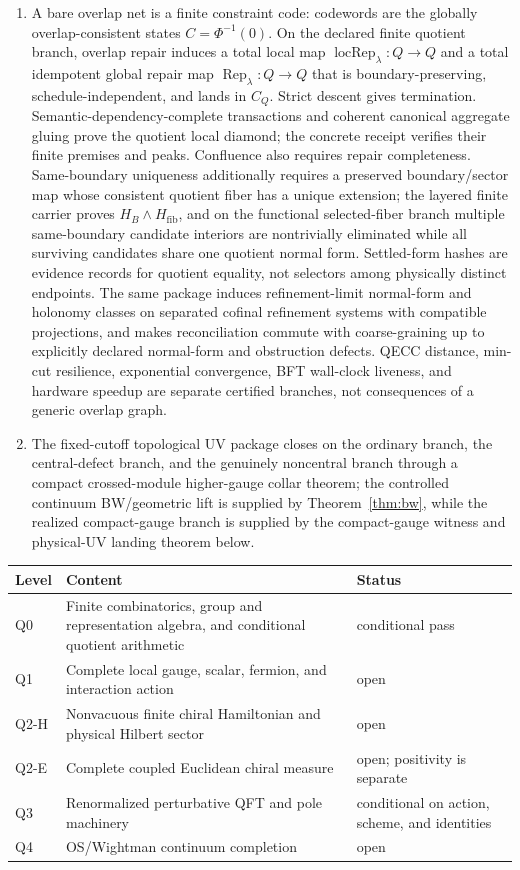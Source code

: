 \documentclass[11pt]{article}
\begin{document}
\begin{enumerate}[leftmargin=2em]
\item A bare overlap net is a finite constraint code: codewords are the globally overlap-consistent states \(C=\Phi^{-1}(0)\). On the declared finite quotient branch, overlap repair induces a total local map \(\operatorname{locRep}_\lambda:Q\to Q\) and a total idempotent global repair map \(\operatorname{Rep}_\lambda:Q\to Q\) that is boundary-preserving, schedule-independent, and lands in \(C_Q\). Strict descent gives termination. Semantic-dependency-complete transactions and coherent canonical aggregate gluing prove the quotient local diamond; the concrete receipt verifies their finite premises and peaks. Confluence also requires repair completeness. Same-boundary uniqueness additionally requires a preserved boundary/sector map whose consistent quotient fiber has a unique extension; the layered finite carrier proves \(H_B\wedge H_{\mathrm{fib}}\), and on the functional selected-fiber branch multiple same-boundary candidate interiors are nontrivially eliminated while all surviving candidates share one quotient normal form. Settled-form hashes are evidence records for quotient equality, not selectors among physically distinct endpoints. The same package induces refinement-limit normal-form and holonomy classes on separated cofinal refinement systems with compatible projections, and makes reconciliation commute with coarse-graining up to explicitly declared normal-form and obstruction defects. QECC distance, min-cut resilience, exponential convergence, BFT wall-clock liveness, and hardware speedup are separate certified branches, not consequences of a generic overlap graph.
\item The fixed-cutoff topological UV package closes on the ordinary branch, the central-defect branch, and the genuinely noncentral branch through a compact crossed-module higher-gauge collar theorem; the controlled continuum BW/geometric lift is supplied by Theorem~\ref{thm:bw}, while the realized compact-gauge branch is supplied by the compact-gauge witness and physical-UV landing theorem below.
\end{enumerate}

\begin{center}
\small
\begin{tabular}{@{}p{}p{}p{}@{}}
\toprule
Level & Content & Status \\
\midrule
Q0 & Finite combinatorics, group and representation algebra, and conditional quotient arithmetic & conditional pass \\
Q1 & Complete local gauge, scalar, fermion, and interaction action & open \\
Q2-H & Nonvacuous finite chiral Hamiltonian and physical Hilbert sector & open \\
Q2-E & Complete coupled Euclidean chiral measure & open; positivity is separate \\
Q3 & Renormalized perturbative QFT and pole machinery & conditional on action, scheme, and identities \\
Q4 & OS/Wightman continuum completion & open \\
\bottomrule
\end{tabular}
\end{center}
\end{document}
